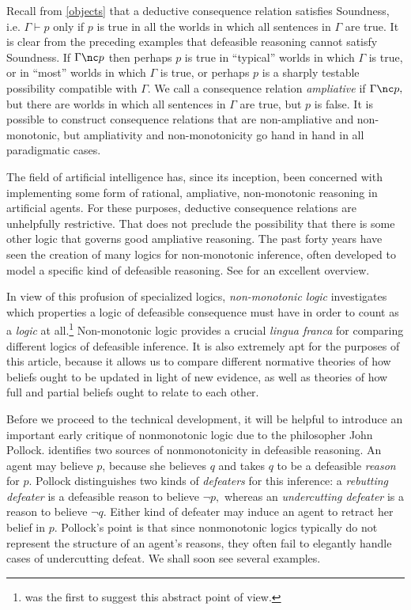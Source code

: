Recall from \autoref{objects} that a deductive consequence relation satisfies
Soundness, i.e. $\Gamma \vdash p$ only if $p$ is true in all the worlds in which
all sentences in $\Gamma$ are true. It is clear from the preceding examples that
defeasible reasoning cannot satisfy Soundness. If $\Gamma \nc p$ then perhaps
$p$ is true in ``typical'' worlds in which $\Gamma$ is true, or in ``most''
worlds in which $\Gamma$ is true, or perhaps $p$ is a sharply testable
possibility compatible with $\Gamma$. We call a consequence relation  {\em
ampliative} if $\Gamma \nc p,$ but there are worlds in which all sentences in
$\Gamma$ are true, but $p$ is false. It is possible to construct consequence
relations that are non-ampliative and non-monotonic, but ampliativity and
non-monotonicity go hand in hand in all paradigmatic cases.  

The field of artificial intelligence has, since its inception, been concerned
with implementing some form of rational, ampliative, non-monotonic reasoning in
artificial agents. For these purposes, deductive consequence relations are
unhelpfully restrictive. That does not preclude the possibility that there is
some other logic that governs good ampliative reasoning. The past forty years
have seen the creation of many logics for non-monotonic inference, often
developed to model a specific kind of defeasible reasoning. See
\citet{sep-logic-nonmonotonic} for an excellent overview.

In view of this profusion of specialized logics, {\em non-monotonic logic}
investigates which properties a logic of defeasible consequence must have in
order to count as a {\em logic} at all.\footnote{\citet{gabbay1985theoretical}
was the first to suggest this abstract point of view.} Non-monotonic logic
provides a crucial {\em lingua franca} for comparing different logics of
defeasible inference. It is also extremely apt for the purposes of this article,
because it allows us to compare different normative theories of how beliefs
ought to be updated in light of new evidence, as well as theories of how full
and partial beliefs ought to relate to each other.  

Before we proceed to the technical development, it will be helpful to introduce
an important early critique of nonmonotonic logic due to the philosopher John
Pollock. \citet{pollock1987defeasible} identifies two sources of nonmonotonicity
in defeasible reasoning. An agent may believe $p$, because she believes $q$ and
takes $q$ to be a defeasible {\em reason} for $p$. Pollock distinguishes two
kinds of {\em defeaters} for this inference: a {\em rebutting defeater} is a
defeasible reason to believe $\neg p,$ whereas an {\em undercutting defeater} is
a reason to believe $\neg q$. Either kind of defeater may induce an agent to
retract her belief in $p$. Pollock's point is that since nonmonotonic logics
typically do not represent the structure of an agent's reasons, they often fail
to elegantly handle cases of undercutting defeat. We shall soon see several
examples. 

